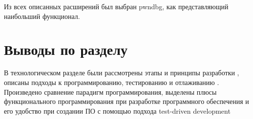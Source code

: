 Из всех описанных расширений был выбран pwndbg, как представляющий
наибольший функционал.


\section*{Выводы по разделу}\label{sec:ch1/sec2}
В технологическом разделе были рассмотрены этапы и принципы разработки {\ProgModule}, 
описаны подходы к программированию, тестированию и отлаживанию {\ProgModule}.
Произведено сравнение парадигм программирования, выделены плюсы функционального
программирования при разработке программного обеспечения и его удобство при 
создании ПО с помощью подхода test-driven development
